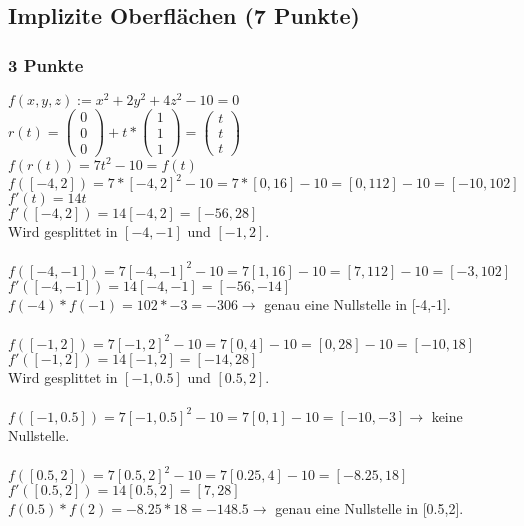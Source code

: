 \newif\ifvimbug
\vimbugfalse

\ifvimbug

\fi


\subsection{Implizite Oberflächen (7 Punkte)}
\subsubsection{3 Punkte}
$f(x,y,z) := x^2 + 2y^2 + 4z^2 - 10 = 0$ \\
$r(t) = \begin{pmatrix} 0 \\ 0 \\ 0\end{pmatrix} + t * \begin{pmatrix} 1 \\ 1 \\ 1\end{pmatrix} = \begin{pmatrix} t \\ t \\ t\end{pmatrix}$ \\
$f(r(t)) = 7t^2 - 10 = f(t)$\\
$f([-4,2]) = 7 * [-4,2]^2-10 = 7*[0,16]-10 = [0,112]-10 = [-10,102]$ \\
$f'(t) = 14t$ \\
$f'([-4,2]) = 14[-4,2] = [-56,28]$ \\
Wird gesplittet in $[-4,-1]$ und $[-1,2]$. \\ \\
$f([-4,-1]) = 7[-4,-1]^2-10 = 7[1,16]-10 = [7,112]-10 = [-3,102]$ \\
$f'([-4,-1]) = 14[-4,-1] = [-56,-14]$ \\
$f(-4)*f(-1) = 102 * -3 = -306 \rightarrow$ genau eine Nullstelle in [-4,-1]. \\\\
$f([-1,2]) = 7[-1,2]^2-10 = 7[0,4]-10 = [0,28]-10 = [-10,18]$\\
$f'([-1,2]) = 14[-1,2] = [-14,28]$ \\
Wird gesplittet in $[-1,0.5]$ und $[0.5,2]$. \\ \\
$f([-1,0.5]) = 7[-1,0.5]^2-10 = 7[0,1]-10 = [-10,-3] \rightarrow$ keine Nullstelle. \\\\
$f([0.5,2]) = 7[0.5,2]^2-10 = 7[0.25,4]-10 = [-8.25,18]$ \\
$f'([0.5,2]) = 14[0.5,2] = [7,28]$ \\
$f(0.5)*f(2) = -8.25*18 = -148.5 \rightarrow$ genau eine Nullstelle in [0.5,2]. 

